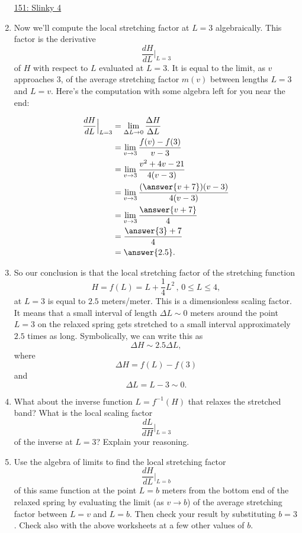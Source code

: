 \documentclass{ximera}
\begin{document}
\begin{example}
\begin{enumerate}
\href{https://www.desmos.com/calculator/zsbupxubm6}{151: Slinky 4}


\item Now we'll compute the local stretching factor at $L=3$ algebraically. This factor is the derivative
\[
  \frac{dH}{dL}\Big|_{L=3} 
\]
of $H$ with respect to $L$ evaluated at $L=3$. It is equal to the limit, as $v$ approaches $3$, of the average stretching factor $m(v)$ between lengths $L=3$ and $L=v$. Here's the computation with some algebra left for you near the end:

\begin{align*}
  \frac{dH}{dL}\Big|_{L=3} &= \lim_{\Delta L \to 0} \frac{\Delta H}{\Delta L} \\
              &= \lim_{v\to 3}\frac{f(v) - f(3)}{v-3} \\
              &= \lim_{v\to 3}\frac{v^2+4v-21}{4(v-3)}   \\
              &= \lim_{v\to 3} \frac{(\answer{v+7})(v-3)}{4(v-3)} \\
              &=  \lim_{v\to 3} \frac{\answer{v+7}}{4} \\
              &= \frac{\answer{3}+7}{4}  \\
              &= \answer{2.5} .
\end{align*}

\item So our conclusion is that the local stretching factor of the stretching function
\[
      H = f(L) = L + \frac{1}{4}L^2 \, , \, 0\leq L \leq 4,
\]
at $L=3$ is equal to $2.5$ meters/meter. This is a dimensionless scaling factor. It means that a small interval of length $\Delta L\sim 0$ meters around the point $L=3$ on the relaxed spring gets stretched to a small interval approximately $2.5$ times as long. Symbolically, we can write this as
\[
          \Delta H \sim 2.5\Delta L,
\]
where
\[
   \Delta H = f(L) - f(3)
\]
and 
\[
    \Delta L = L - 3 \sim 0 .
\]

\item What about the inverse function $L=f^{-1}(H)$ that relaxes the stretched band? What is the local scaling factor
\[
   \frac{dL}{dH}\Big|_{L=3}
\]
of the inverse at $L=3$? Explain your reasoning.

\item Use the algebra of limits to find the local stretching factor
\[
  \frac{dH}{dL}\Big|_{L=b}
\]
of this same function at the point $L=b$ meters from the bottom end of the relaxed spring by evaluating the limit (as $v\to b$) of the average stretching factor between $L=v$ and $L=b$. Then check your result by substituting $b=3$. Check also with the above worksheets at a few other values of $b$.
\end{enumerate}

\end{example}
\end{document}

